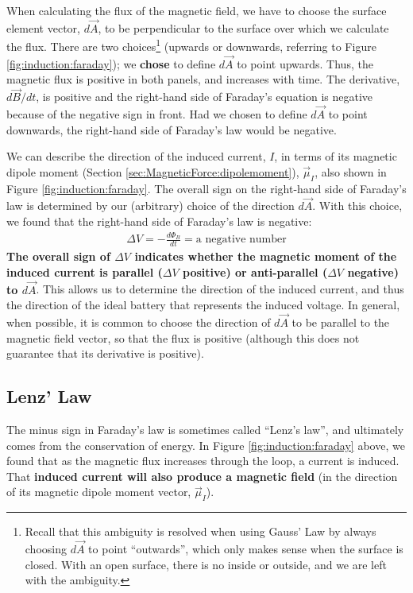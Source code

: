 When calculating the flux of the magnetic field, we have to choose the surface element vector, $d\vec A$, to be perpendicular to the surface over which we calculate the flux. There are two choices\footnote{Recall that this ambiguity is resolved when using Gauss' Law by always choosing $d\vec A$ to point ``outwards'', which only makes sense when the surface is closed. With an open surface, there is no inside or outside, and we are left with the ambiguity.} (upwards or downwards, referring to Figure \ref{fig:induction:faraday}); we \textbf{chose} to define $d\vec A$ to point upwards. Thus, the magnetic flux is positive in both panels, and increases with time. The derivative, $d\vec B/dt$, is positive and the right-hand side of Faraday's equation is negative because of the negative sign in front. Had we chosen to define $d\vec A$ to point downwards, the right-hand side of Faraday's law would be negative.

We can describe the direction of the induced current, $I$, in terms of its magnetic dipole moment (Section \ref{sec:MagneticForce:dipolemoment}), $\vec\mu_I$, also shown in Figure \ref{fig:induction:faraday}. The overall sign on the right-hand side of Faraday's law is determined by our (arbitrary) choice of the direction $d\vec A$. With this choice, we found that the right-hand side of Faraday's law is negative:
\begin{align*}
\Delta V = -\frac{d\Phi_B}{dt}=\text{a negative number}
\end{align*}
\textbf{The overall sign of $\Delta V$ indicates whether the magnetic moment of the induced current is parallel ($\Delta V$ positive) or anti-parallel ($\Delta V$ negative) to $d\vec A$}. This allows us to determine the direction of the induced current, and thus the direction of the ideal battery that represents the induced voltage. In general, when possible, it is common to choose the direction of $d\vec A$ to be parallel to the magnetic field vector, so that the flux is positive (although this does not guarantee that its derivative is positive).

\subsection{Lenz' Law}
The minus sign in Faraday's law is sometimes called ``Lenz's law'', and ultimately comes from the conservation of energy. In Figure \ref{fig:induction:faraday} above, we found that as the magnetic flux increases through the loop, a current is induced. That \textbf{induced current will also produce a magnetic field} (in the direction of its magnetic dipole moment vector, $\vec \mu_I$).

